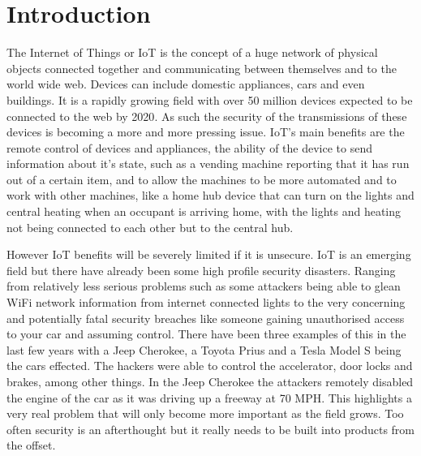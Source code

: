 
\chapter{Introduction}
\label{intro}


\newcommand{\keyword}[1]{\textbf{#1}}
\newcommand{\tabhead}[1]{\textbf{#1}}
\newcommand{\code}[1]{\texttt{#1}}
\newcommand{\file}[1]{\texttt{\bfseries#1}}
\newcommand{\option}[1]{\texttt{\itshape#1}}


The Internet of Things or IoT is the concept of a huge network of physical objects connected together and communicating between themselves and to the world wide web. Devices can include domestic appliances, cars and even buildings. It is a rapidly growing field with over 50 million devices expected to be connected to the web by 2020\cite{50milby2020}. As such the security of the transmissions of these devices is becoming a more and more pressing issue. IoT's main benefits are the remote control of devices and appliances, the ability of the device to send information about it's state, such as a vending machine reporting that it has run out of a certain item, and to allow the machines to be more automated and to work with other machines, like a home hub device that can turn on the lights and central heating when an occupant is arriving home, with the lights and heating not being connected to each other but to the central hub.
	
	However IoT benefits will be severely limited if it is unsecure. IoT is an emerging field but there have already been some high profile security disasters. Ranging from relatively less serious problems such as some attackers being able to glean WiFi network information from internet connected lights\cite{hackingsum} to the very concerning and potentially fatal security breaches like someone gaining unauthorised access to your car and assuming control. There have been three examples of this in the last few years with a Jeep Cherokee\cite{jeephack}, a Toyota Prius\cite{priushack} and a Tesla Model S\cite{teslahack} being the cars effected. The hackers were able to control the accelerator, door locks and brakes, among other things. In the Jeep Cherokee the attackers remotely disabled the engine of the car as it was driving up a freeway at 70 MPH. This highlights a very real problem that will only become more important as the field grows. Too often security is an afterthought but it really needs to be built into products from the offset.

